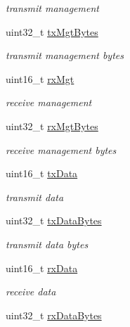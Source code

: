 \begin{DoxyCompactItemize}
\begin{DoxyCompactList}\small\item\em transmit management \end{DoxyCompactList}\item 
uint32\+\_\+t \hyperlink{structns3_1_1dot11s_1_1HwmpProtocolMac_1_1Statistics_a00b3e08551613bc05de3890e009db1cb}{tx\+Mgt\+Bytes}
\begin{DoxyCompactList}\small\item\em transmit management bytes \end{DoxyCompactList}\item 
uint16\+\_\+t \hyperlink{structns3_1_1dot11s_1_1HwmpProtocolMac_1_1Statistics_a2cc31314569586538efb043e29f0f8b6}{rx\+Mgt}
\begin{DoxyCompactList}\small\item\em receive management \end{DoxyCompactList}\item 
uint32\+\_\+t \hyperlink{structns3_1_1dot11s_1_1HwmpProtocolMac_1_1Statistics_abb4985a260d7a4c4442168ca98c79dec}{rx\+Mgt\+Bytes}
\begin{DoxyCompactList}\small\item\em receive management bytes \end{DoxyCompactList}\item 
uint16\+\_\+t \hyperlink{structns3_1_1dot11s_1_1HwmpProtocolMac_1_1Statistics_a589e4207bdf4fa5f73350b602cc62395}{tx\+Data}
\begin{DoxyCompactList}\small\item\em transmit data \end{DoxyCompactList}\item 
uint32\+\_\+t \hyperlink{structns3_1_1dot11s_1_1HwmpProtocolMac_1_1Statistics_a50db26efb7b9d224d4c803000a31ae39}{tx\+Data\+Bytes}
\begin{DoxyCompactList}\small\item\em transmit data bytes \end{DoxyCompactList}\item 
uint16\+\_\+t \hyperlink{structns3_1_1dot11s_1_1HwmpProtocolMac_1_1Statistics_a86cc234b540b881cb752768f22345d77}{rx\+Data}
\begin{DoxyCompactList}\small\item\em receive data \end{DoxyCompactList}\item 
uint32\+\_\+t \hyperlink{structns3_1_1dot11s_1_1HwmpProtocolMac_1_1Statistics_aca61136ff1c29fb38824c88972990475}{rx\+Data\+Bytes}
\end{DoxyCompactItemize}


